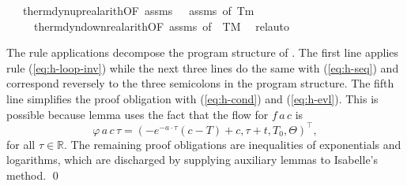 \documentclass[envcountsame,envcountsect]{llncs}
\newcommand{\flow}{\varphi}
\newcommand{\reals}{\mathbb{R}}
\begin{document}
\begin{example}
\begin{isabellebody}
\ \ \isamarkupfalse\ therm{\isacharunderscore}dyn{\isacharunderscore}up{\isacharunderscore }real{\isacharunderscore}arith{\isacharbrackleft}OF\ assms{\isacharparenleft}{}{\isacharparenright}\ {\isacharunderscore}\ {\isacharunderscore}\ assms{\isacharparenleft}{}{\isacharparenright}{\isacharcomma}\ of\ T\isactrlsub m{\isacharbrackright}\isanewline
\ \ \ \ \ therm{\isacharunderscore}dyn{\isacharunderscore}down{\isacharunderscore }real{\isacharunderscore}arith{\isacharbrackleft}OF\ assms{\isacharparenleft}{}{\isacharcomma}{}{\isacharparenright}{\isacharcomma}\ of\ {\isacharunderscore}\ T\isactrlsub M{\isacharbrackright}\ \isamarkupfalse%
\ rel{\isacharunderscore}auto{\isacharprime}\isanewline
\end{isabellebody}

The rule applications decompose the program structure of . The first line applies rule (\ref{eq:h-loop-inv}) while the next three lines do the same with (\ref{eq:h-seq}) and correspond reversely to the three semicolons in the program structure. The fifth line simplifies the proof obligation with (\ref{eq:h-cond}) and (\ref{eq:h-evl}). This is possible because lemma  uses the fact that the flow for $f\, a\, c$ is  
\begin{equation*}
\flow\, a\, c\, \tau = (-e^{-a\cdot\tau}(c-T)+c, \tau+t, T_0, \Theta)^\top,
\end{equation*}
for all $\tau\in\reals$. The remaining proof obligations are inequalities of exponentials and logarithms, which are discharged by supplying auxiliary lemmas to Isabelle's  method. \qed
\end{example}
\end{document}
